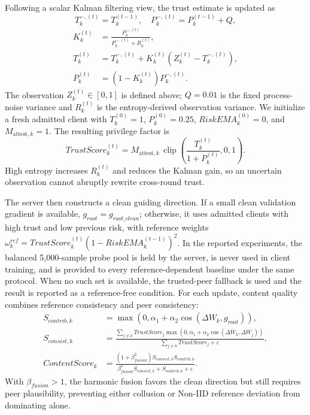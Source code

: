 \documentclass[runningheads,orivec]{llncs}
\begin{document}
Following a scalar Kalman filtering view, the trust estimate is updated as
\begin{equation}
    T_{k}^{-,(t)}=T_k^{(t-1)},\quad P_{k}^{-,(t)}=P_k^{(t-1)}+Q,
\end{equation}
\begin{equation}
\begin{aligned}
    K_k^{(t)}&=\frac{P_k^{-,(t)}}{P_k^{-,(t)}+R_k^{(t)}},\\
    T_k^{(t)}&=T_k^{-,(t)}+K_k^{(t)}(Z_k^{(t)}-T_k^{-,(t)}),\\
    P_k^{(t)}&=(1-K_k^{(t)})P_k^{-,(t)}.
\end{aligned}
\end{equation}
The observation $Z_k^{(t)}\in[0,1]$ is defined above; $Q=0.01$ is the fixed process-noise variance and $R_k^{(t)}$ is the entropy-derived observation variance. We initialize a fresh admitted client with $T_k^{(0)}=1$, $P_k^{(0)}=0.25$, $RiskEMA_k^{(0)}=0$, and $M_{\text{attest},k}=1$. The resulting privilege factor is
\begin{equation}
    TrustScore_k^{(t)}=M_{\text{attest},k}\,\operatorname{clip}\!\left(\frac{T_k^{(t)}}{1+P_k^{(t)}},0,1\right).
\end{equation}
High entropy increases $R_k^{(t)}$ and reduces the Kalman gain, so an uncertain observation cannot abruptly rewrite cross-round trust.

The server then constructs a clean guiding direction. If a small clean validation gradient is available, $g_{root}=g_{root\_clean}$; otherwise, it uses admitted clients with high trust and low previous risk, with reference weights $\omega_k^{ref}=TrustScore_k^{(t)}(1-RiskEMA_k^{(t-1)})^2$. In the reported experiments, the balanced 5,000-sample probe pool is held by the server, is never used in client training, and is provided to every reference-dependent baseline under the same protocol. When no such set is available, the trusted-peer fallback is used and the result is reported as a reference-free condition. For each update, content quality combines reference consistency and peer consistency:
\begin{align}
    S_{contrib,k}  & =\max(0,\alpha_1+\alpha_2\cos(\Delta W_k,g_{root})),                                  \\
    S_{consist,k}  & =\frac{\sum_{j\ne k}TrustScore_j\max(0,\alpha_1+\alpha_2\cos(\Delta W_k,\Delta W_j))}
    {\sum_{j\ne k}TrustScore_j+\varepsilon},                                                               \\
    ContentScore_k & =\frac{(1+\beta_{fusion}^2)S_{consist,k}S_{contrib,k}}
    {\beta_{fusion}^2S_{consist,k}+S_{contrib,k}+\varepsilon}.
\end{align}
With $\beta_{fusion}>1$, the harmonic fusion favors the clean direction but still requires peer plausibility, preventing either collusion or Non-IID reference deviation from dominating alone.
\end{document}
